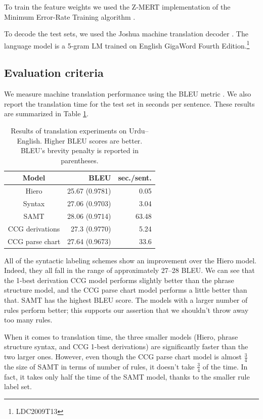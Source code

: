 \documentclass[a4paper]{article}
\begin{document}
To train the feature weights we used the Z-MERT implementation \cite{zmert} of the Minimum Error-Rate Training algorithm \cite{mert}.

To decode the test sets, we used the Joshua machine translation decoder \cite{joshua3}. The language model is a 5-gram LM trained on English GigaWord Fourth Edition.\footnote{LDC2009T13}

\subsection{Evaluation criteria}

We measure machine translation performance using the BLEU metric \cite{papineni-bleu}. We also report the translation time for the test set in seconds per sentence. These results are summarized in Table \ref{table:results}.

\begin{table}
\centering
\begin{tabular}{|c|r|r|}
\hline
Model & BLEU & sec./sent. \\
\hline
Hiero & 25.67 (0.9781) & 0.05 \\
Syntax & 27.06 (0.9703) & 3.04 \\
SAMT & 28.06 (0.9714) & 63.48 \\
CCG derivations & 27.3 (0.9770) & 5.24 \\
CCG parse chart & 27.64 (0.9673) & 33.6 \\
\hline
\end{tabular}
\caption{Results of translation experiments on Urdu--English. Higher BLEU scores are better. BLEU's brevity penalty is reported in parentheses.\label{table:results}}
\end{table}

All of the syntactic labeling schemes show an improvement over the Hiero model. Indeed, they all fall in the range of approximately 27--28 BLEU. We can see that the 1-best derivation CCG model performs slightly better than the phrase structure model, and the CCG parse chart model performs a little better than that. SAMT has the highest BLEU score. The models with a larger number of rules perform better; this supports our assertion that we shouldn't throw away too many rules.

When it comes to translation time, the three smaller models (Hiero, phrase structure syntax, and CCG 1-best derivations) are significantly faster than the two larger ones. However, even though the CCG parse chart model is almost $\frac{3}{4}$ the size of SAMT in terms of number of rules, it doesn't take $\frac{3}{4}$ of the time. In fact, it takes only half the time of the SAMT model, thanks to the smaller rule label set.
\end{document}
